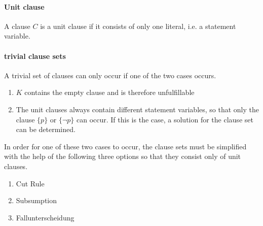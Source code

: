 \paragraph{Unit clause} %
A clause $C$ is a unit clause if it consists of only one literal, i.e. a statement variable.
\paragraph{trivial clause sets} %
A trivial set of clauses can only occur if one of the two cases occurs.
\begin{enumerate}
\item %
$K$ contains the empty clause and is therefore unfulfillable
\item %
The unit clauses always contain different statement variables, so that only the clause $\{p\}$ or $\{\neg p\}$ can occur. If this is the case, a solution for the clause set can be determined.
\\
\end{enumerate}
In order for one of these two cases to occur, the clause sets must be simplified with the help of the following three options so that they consist only of unit clauses.
\begin{enumerate}
\item Cut Rule %
\item Subsumption
\item Fallunterscheidung
\end{enumerate}

